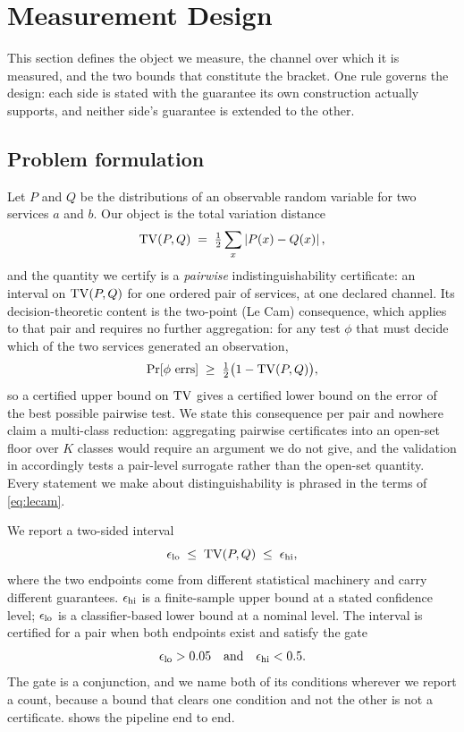 \section{Measurement Design}
\label{sec:design}

This section defines the object we measure, the channel over which it is
measured, and the two bounds that constitute the bracket. One rule governs the
design: each side is stated with the guarantee its own construction actually
supports, and neither side's guarantee is extended to the other.

\subsection{Problem formulation}
\label{sec:design/problem}

Let $P$ and $Q$ be the distributions of an observable random variable for two
services $a$ and $b$. Our object is the total variation distance
\begin{equation}
  \mathrm{TV}(P,Q) \;=\; \tfrac{1}{2}\sum_{x} \left\lvert P(x) - Q(x) \right\rvert,
  \label{eq:tv}
\end{equation}
and the quantity we certify is a \emph{pairwise} indistinguishability
certificate: an interval on $\mathrm{TV}(P,Q)$ for one ordered pair of services, at one
declared channel. Its decision-theoretic content is the two-point (Le Cam)
consequence, which applies to that pair and requires no further aggregation: for
any test $\phi$ that must decide which of the two services generated an
observation,
\begin{equation}
  \Pr[\phi \text{ errs}] \;\ge\; \tfrac{1}{2}\bigl(1 - \mathrm{TV}(P,Q)\bigr),
  \label{eq:lecam}
\end{equation}
so a certified upper bound on $\mathrm{TV}$ gives a certified lower bound on the error
of the best possible pairwise test. We state this consequence per pair and
nowhere claim a multi-class reduction: aggregating pairwise certificates into an
open-set floor over $K$ classes would require an argument we do not give, and
the validation in  accordingly tests a
pair-level surrogate rather than the open-set quantity. Every statement we make
about distinguishability is phrased in the terms of \eqref{eq:lecam}.

We report a two-sided interval
\begin{equation}
  \epsilon_{\mathrm{lo}} \;\le\; \mathrm{TV}(P,Q) \;\le\; \epsilon_{\mathrm{hi}} ,
  \label{eq:bracket}
\end{equation}
where the two endpoints come from different statistical machinery and carry
different guarantees. $\epsilon_{\mathrm{hi}}$ is a finite-sample upper bound at a stated
confidence level; $\epsilon_{\mathrm{lo}}$ is a classifier-based lower bound at a nominal
level. The interval is
certified for a pair when both endpoints exist and satisfy the gate
\begin{equation}
  \epsilon_{\mathrm{lo}} > 0.05 \quad\text{and}\quad \epsilon_{\mathrm{hi}} < 0.5 .
  \label{eq:gate}
\end{equation}
The gate is a conjunction, and we name both of its conditions wherever we report
a count, because a bound that clears one condition and not the other is not a
certificate.  shows the pipeline end to end.

